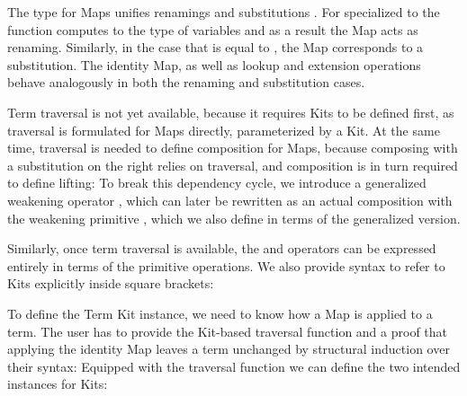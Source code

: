 \documentclass[screen,nonacm]{acmart}
\begin{document}
\begin{minipage}[t]{0.48\linewidth}
      \raggedright{}
      \AMapA{}
\end{minipage}
\begin{minipage}[t]{0.48\linewidth}
      \raggedright{}
      \AMapB{}
\end{minipage}

\noindent The type for Maps    unifies
renamings    and substitutions
  . For  specialized
to  the  function computes to
the type of variables and as a result the Map acts as renaming. Similarly, in
the case that  is equal to , the Map
corresponds to a substitution. The identity Map, as well as lookup and
extension operations behave analogously in both the renaming and substitution
cases.

Term traversal is not yet available, because it requires Kits to be defined
first, as traversal is formulated for Maps directly, parameterized by a Kit. At
the same time, traversal is needed to define composition for Maps, because
composing with a substitution on the right relies on traversal, and composition
is in turn required to define lifting: \ALifting{}To break this dependency
cycle, we introduce a generalized weakening operator ,
which can later be rewritten as an actual composition with the weakening
primitive , which we also define in terms of the generalized
version.

Similarly, once term traversal is available, the  and
 operators can be expressed entirely in terms of the
primitive operations. We also provide syntax to refer to Kits explicitly inside
square brackets:

\noindent\begin{minipage}[t]{0.48\linewidth}
      \raggedright{}
      \AKitExplicit{}
\end{minipage}
\begin{minipage}[t]{0.48\linewidth}
      \raggedright{}
      \AExpId{}
\end{minipage}

\noindent To define the Term Kit instance, we need to know how a Map is
applied to a term. The user has to provide the Kit-based traversal function and
a proof that applying the identity Map leaves a term unchanged by structural induction over their syntax:
\ATraversal{}Equipped with the traversal function we can define the two
intended instances for Kits:
\end{document}
